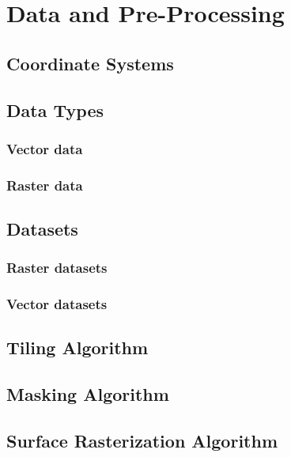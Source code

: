 \chapter{Data and Pre-Processing}%
\label{sec:data}

\section{Coordinate Systems}

\section{Data Types}
\subsection{Vector data}
\subsection{Raster data}

\section{Datasets}
\subsection{Raster datasets}
\subsection{Vector datasets}

\section{Tiling Algorithm}

\section{Masking Algorithm}

\newpage
\section{Surface Rasterization Algorithm}


